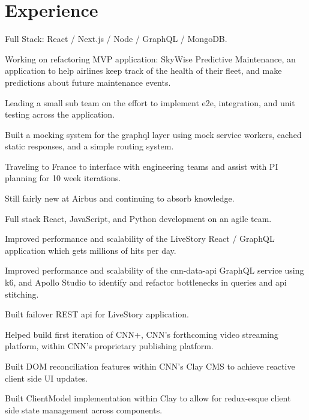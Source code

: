 \documentclass[]{pb-resume}
\begin{document}
\begin{minipage}[t]{0.66\textwidth} 

\section{Experience}
\vspace{\topsep} %
\begin{tightemize}
\item Full Stack: React / Next.js / Node / GraphQL / MongoDB.
\item Working on refactoring MVP application: SkyWise Predictive Maintenance, an application to help airlines keep track of the health of their fleet, and make predictions about future maintenance events.
\item Leading a small sub team on the effort to implement e2e, integration, and unit testing across the application. 
\item Built a mocking system for the graphql layer using mock service workers, cached static responses, and a simple routing system.
\item Traveling to France to interface with engineering teams and assist with PI planning for 10 week iterations.
\item Still fairly new at Airbus and continuing to absorb knowledge. 
\end{tightemize}
\sectionsep

\vspace{\topsep} %
\begin{tightemize}
\item Full stack React, JavaScript, and Python development on an agile team.
\item Improved performance and scalability of the LiveStory React / GraphQL application which gets millions of hits per day.
\item Improved performance and scalability of the cnn-data-api GraphQL service using k6, and Apollo Studio to identify and refactor bottlenecks in queries and api stitching.
\item Built failover REST api for LiveStory application.
\item Helped build first iteration of CNN+, CNN's forthcoming video streaming platform, within CNN's proprietary publishing platform.
\item Built DOM reconciliation features within CNN's Clay CMS to achieve reactive client side UI updates.
\item Built ClientModel implementation within Clay to allow for redux-esque client side state management across components.
\end{tightemize}
\sectionsep



\end{minipage}
\end{document}
